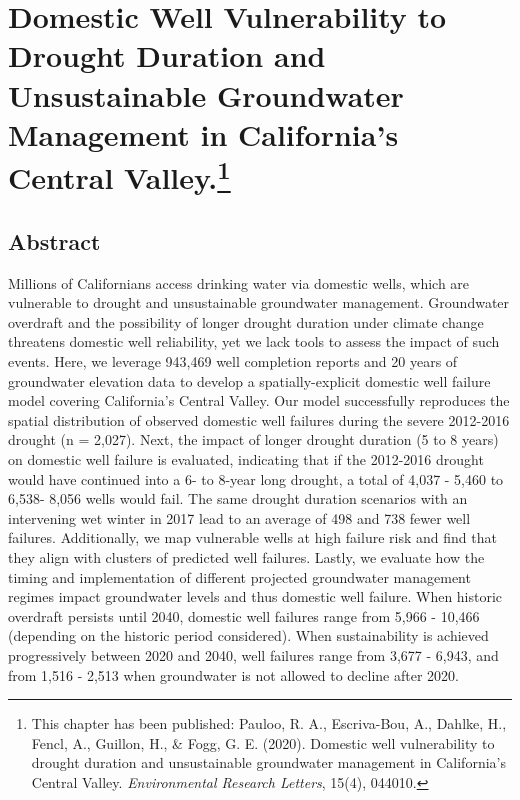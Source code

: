 
\chapter[Domestic Well Vulnerability to Drought Duration and Unsustainable Groundwater Management in California's Central Valley.]{Domestic Well Vulnerability to Drought Duration and Unsustainable Groundwater Management in California's Central Valley.\footnote[1]{This chapter has been published: Pauloo, R. A., Escriva-Bou, A., Dahlke, H., Fencl, A., Guillon, H., \& Fogg, G. E. (2020). Domestic well vulnerability to drought duration and unsustainable groundwater management in California’s Central Valley. \textit{Environmental Research Letters}, 15(4), 044010.}}



\section{Abstract}
    
\noindent Millions of Californians access drinking water via domestic wells, which are vulnerable to drought and unsustainable groundwater management. Groundwater overdraft and the possibility of longer drought duration under climate change threatens domestic well reliability, yet we lack tools to assess the impact of such events. Here, we leverage 943,469 well completion reports and 20 years of groundwater elevation data to develop a spatially-explicit domestic well failure model covering California's Central Valley. Our model successfully reproduces the spatial distribution of observed domestic well failures during the severe 2012-2016 drought (n = 2,027). Next, the impact of longer drought duration (5 to 8 years) on domestic well failure is evaluated, indicating that if the 2012-2016 drought would have continued into a 6- to 8-year long drought, a total of 4,037 - 5,460 to 6,538- 8,056 wells would fail. The same drought duration scenarios with an intervening wet winter in 2017 lead to an average of 498 and 738 fewer well failures. Additionally, we map vulnerable wells at high failure risk and find that they align with clusters of predicted well failures. Lastly, we evaluate how the timing and implementation of different projected groundwater management regimes impact groundwater levels and thus domestic well failure. When historic overdraft persists until 2040, domestic well failures range from 5,966 - 10,466 (depending on the historic period considered). When sustainability is achieved progressively between 2020 and 2040, well failures range from 3,677 - 6,943, and from 1,516 - 2,513 when groundwater is not allowed to decline after 2020. 


